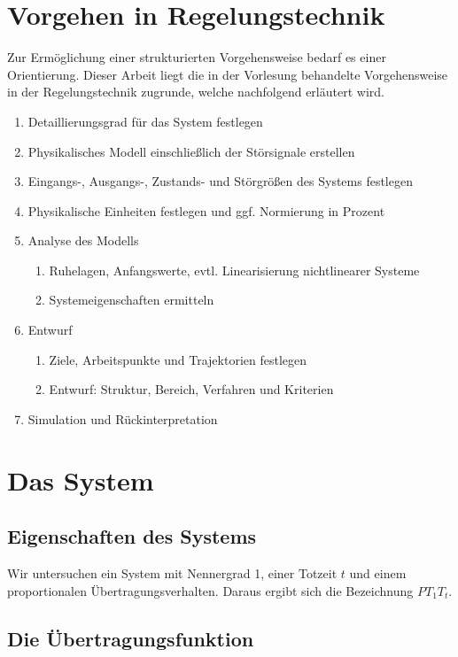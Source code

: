 \section{Vorgehen in Regelungstechnik}
Zur Ermöglichung einer strukturierten Vorgehensweise bedarf es einer Orientierung. Dieser Arbeit liegt die in der Vorlesung behandelte Vorgehensweise in der Regelungstechnik zugrunde, welche nachfolgend erläutert wird.

\begin{enumerate}
    \item Detaillierungsgrad für das System festlegen
    \item Physikalisches Modell einschließlich der Störsignale erstellen
    \item Eingangs-, Ausgangs-, Zustands- und Störgrößen des Systems festlegen
    \item Physikalische Einheiten festlegen und ggf. Normierung in Prozent
    \item Analyse des Modells
    \begin{enumerate}
        \item Ruhelagen, Anfangswerte, evtl. Linearisierung nichtlinearer Systeme
        \item Systemeigenschaften ermitteln
    \end{enumerate}
    \item Entwurf
    \begin{enumerate}
        \item Ziele, Arbeitspunkte und Trajektorien festlegen
        \item Entwurf: Struktur, Bereich, Verfahren und Kriterien
    \end{enumerate}
    \item Simulation und Rückinterpretation
\end{enumerate}

\section{Das System}


\subsection{Eigenschaften des Systems}
Wir untersuchen ein System mit Nennergrad 1, einer Totzeit $t$ und einem proportionalen Übertragungsverhalten. Daraus ergibt sich die Bezeichnung $PT_{1}T_{t}$.

\subsection{Die Übertragungsfunktion}


